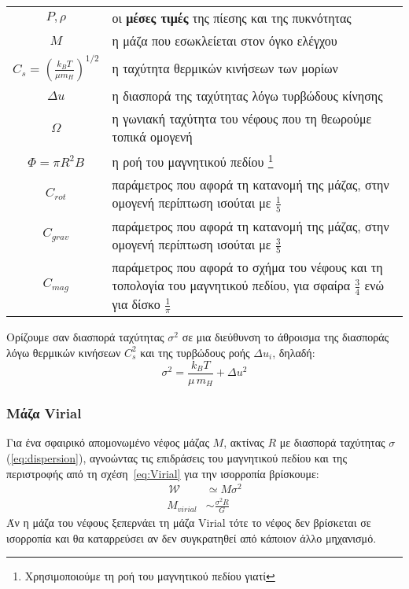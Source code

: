 \documentclass[a4paper,11pt]{memoir}
\newcommand{\WW}{\,\mathcal{W}}
\begin{document}
\begin{tabular}{|c p{9cm}}
$P,\rho$ &οι \textbf{μέσες τιμές} της πίεσης και της πυκνότητας \\
$M$ &η μάζα που εσωκλείεται στον όγκο ελέγχου\\
$C_s =\left( \frac{k_B T}{\mu m_H}\right) ^{1/2}$ &η ταχύτητα θερμικών κινήσεων των μορίων \\
$\Delta u$ &η διασπορά της ταχύτητας λόγω τυρβώδους κίνησης \\
$\Omega$ &η γωνιακή ταχύτητα του νέφους που τη θεωρούμε τοπικά ομογενή \\
$\Phi=\pi R^2 B$ &η ροή του μαγνητικού πεδίου \footnote{Χρησιμοποιούμε τη ροή του μαγνητικού πεδίου γιατί } \\
$C_{rot}$ &παράμετρος που αφορά τη κατανομή της μάζας, στην ομογενή περίπτωση ισούται με $\frac{1}{5}$ \\
$C_{grav}$ &παράμετρος που αφορά τη κατανομή της μάζας, στην ομογενή περίπτωση ισούται με $\frac{3}{5}$ \\
$C_{mag}$ &παράμετρος που αφορά το σχήμα του νέφους και τη τοπολογία του μαγνητικού πεδίου, για σφαίρα $\frac{3}{4}$ ενώ για δίσκο $\frac{1}{\pi}$
\end{tabular}

\medskip

Ορίζουμε σαν διασπορά ταχύτητας $\sigma ^2$ σε μια διεύθυνση το άθροισμα της διασποράς λόγω θερμικών κινήσεων $C_s ^2 $ και της τυρβώδους ροής $\Delta u _i $, δηλαδή:
\begin{equation}
\label{eq:dispersion}
\sigma ^2=\frac{k_B T}{\mu \, m_H}+ \Delta u^2
\end{equation} 

\subsubsection{Μάζα Virial}
\label{par:VirialMass}
Για ένα σφαιρικό απομονωμένο νέφος μάζας $M$, ακτίνας $R$ με διασπορά ταχύτητας $\sigma$ (\ref{eq:dispersion}), αγνοώντας τις επιδράσεις του μαγνητικού πεδίου και της περιστροφής από τη σχέση~\ref{eq:Virial} για την ισορροπία βρίσκουμε:
\begin{align}
\WW &\simeq M\sigma ^2 \\
M_{virial} &\sim \frac{\sigma ^2 R}{G} 
\end{align} 
Άν η μάζα του νέφους ξεπερνάει τη μάζα Virial τότε το νέφος δεν βρίσκεται σε ισορροπία και θα καταρρεύσει αν δεν συγκρατηθεί από κάποιον άλλο μηχανισμό.
\end{document}
